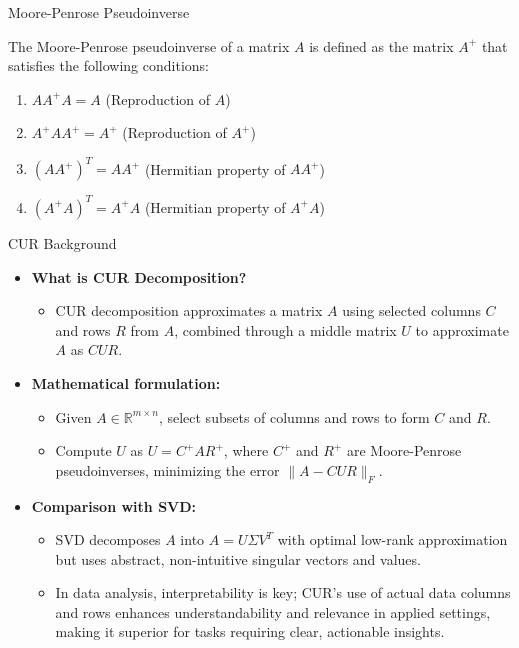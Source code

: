 \documentclass[pdf]
{beamer}
\begin{document}
\begin{frame}{Moore-Penrose Pseudoinverse}
    \begin{definition}
        The Moore-Penrose pseudoinverse of a matrix \( A \) is defined as the matrix \( A^+ \) that satisfies the following conditions:
        \begin{enumerate}
            \item \( AA^+A = A \) \quad (Reproduction of \( A \))
            \item \( A^+AA^+ = A^+ \) \quad (Reproduction of \( A^+ \))
            \item \( (AA^+)^T = AA^+ \) \quad (Hermitian property of \( AA^+ \))
            \item \( (A^+A)^T = A^+A \) \quad (Hermitian property of \( A^+A \))
        \end{enumerate}
    \end{definition}
\end{frame}


\begin{frame}{CUR Background}
    \begin{itemize}
        \item \textbf{What is CUR Decomposition?}
            \begin{itemize}
                \item CUR decomposition approximates a matrix \(A\) using selected columns \(C\) and rows \(R\) from \(A\), combined through a middle matrix \(U\) to approximate \(A\) as \(CUR\).
            \end{itemize}
        \item \textbf{Mathematical formulation:}
            \begin{itemize}
                \item Given \(A \in \mathbb{R}^{m \times n}\), select subsets of columns and rows to form \(C\) and \(R\).
                \item Compute \(U\) as \(U = C^+ A R^+\), where \(C^+\) and \(R^+\) are Moore-Penrose pseudoinverses, minimizing the error \( \| A - CUR \|_F \).
            \end{itemize}
        \item \textbf{Comparison with SVD:}
            \begin{itemize}
                \item SVD decomposes \(A\) into \(A = U \Sigma V^T\) with optimal low-rank approximation but uses abstract, non-intuitive singular vectors and values.
                \item In data analysis, interpretability is key; CUR's use of actual data columns and rows enhances understandability and relevance in applied settings, making it superior for tasks requiring clear, actionable insights.
            \end{itemize}
    \end{itemize}
\end{frame}
\end{document}
